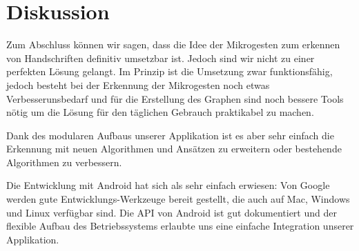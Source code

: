 \chapter{Diskussion}
Zum Abschluss können wir sagen, dass die Idee der Mikrogesten zum erkennen von Handschriften definitiv umsetzbar ist. Jedoch sind wir nicht zu einer perfekten Lösung gelangt. Im Prinzip ist die Umsetzung zwar funktionsfähig, jedoch besteht bei der Erkennung der Mikrogesten noch etwas Verbesserunsbedarf und für die Erstellung des Graphen sind noch bessere Tools nötig um die Lösung für den täglichen Gebrauch praktikabel zu machen.

Dank des modularen Aufbaus unserer Applikation ist es aber sehr einfach die Erkennung mit neuen Algorithmen und Ansätzen zu erweitern oder bestehende Algorithmen zu verbessern.

Die Entwicklung mit Android hat sich als sehr einfach erwiesen: Von Google werden gute Entwicklungs-Werkzeuge bereit gestellt, die auch auf Mac, Windows und Linux verfügbar sind. Die API von Android ist gut dokumentiert und der flexible Aufbau des Betriebssystems erlaubte uns eine einfache Integration unserer Applikation. 